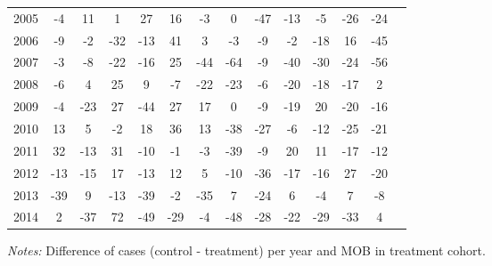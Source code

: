 \begin{table}[H]
\begin{threeparttable}
{\begin{tabular}{l*{13}{c}}
2005        &          -4&          11&           1&          27&          16&          -3&           0&         -47&         -13&          -5&         -26&         -24\\
2006        &          -9&          -2&         -32&         -13&          41&           3&          -3&          -9&          -2&         -18&          16&         -45\\
2007        &          -3&          -8&         -22&         -16&          25&         -44&         -64&          -9&         -40&         -30&         -24&         -56\\
2008        &          -6&           4&          25&           9&          -7&         -22&         -23&          -6&         -20&         -18&         -17&           2\\
2009        &          -4&         -23&          27&         -44&          27&          17&           0&          -9&         -19&          20&         -20&         -16\\
2010        &          13&           5&          -2&          18&          36&          13&         -38&         -27&          -6&         -12&         -25&         -21\\
2011        &          32&         -13&          31&         -10&          -1&          -3&         -39&          -9&          20&          11&         -17&         -12\\
2012        &         -13&         -15&          17&         -13&          12&           5&         -10&         -36&         -17&         -16&          27&         -20\\
2013        &         -39&           9&         -13&         -39&          -2&         -35&           7&         -24&           6&          -4&           7&          -8\\
2014        &           2&         -37&          72&         -49&         -29&          -4&         -48&         -28&         -22&         -29&         -33&           4\\
 \bottomrule \end{tabular} } \begin{tablenotes} \item \scriptsize \emph{Notes:} Difference of cases (control - treatment) per year and MOB in treatment cohort. \end{tablenotes} \end{threeparttable} \end{table} 
